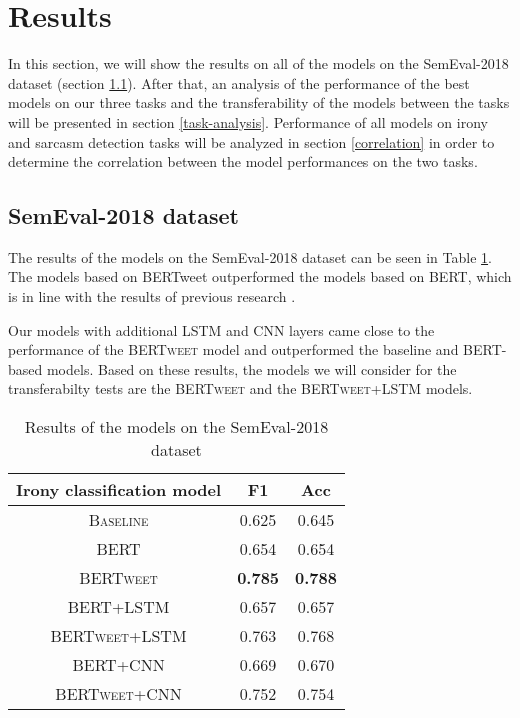 \documentclass[10pt, a4paper]{article}
\begin{document}
\section{Results}

In this section, we will show the results on all of the models on the SemEval-2018 dataset (section \ref{semeval-results}).
After that, an analysis of the performance of the best models on our three tasks and the transferability of the models between
the tasks will be presented in section \ref{task-analysis}. Performance of all models on irony and sarcasm detection tasks
will be analyzed in section \ref{correlation} in order to determine the correlation between the model performances on the two tasks.

\subsection{SemEval-2018 dataset}\label{semeval-results}

The results of the models on the SemEval-2018 dataset can be seen in Table \ref{tab:semeval-2018}. The models based on
BERTweet outperformed the models based on BERT, which is in line with the results of previous research \citep{bertweet}.

Our models with additional LSTM and CNN layers came close to the performance of the \textsc{BERTweet} model and outperformed
the baseline and BERT-based models. Based on these results, the models we will consider for the transferabilty tests are the
\textsc{BERTweet} and the \textsc{BERTweet+LSTM} models.

\begin{table}[h]
   \caption{Results of the models on the SemEval-2018 dataset}
   \label{tab:semeval-2018}
   \begin{center}
   \begin{tabular}{|c|c|c|}
   \toprule
   Irony classification model & F1 & Acc\\
   \midrule
   \textsc{Baseline} & 0.625 & 0.645 \\
   \textsc{BERT} & 0.654 & 0.654 \\
   \textsc{BERTweet} & \textbf{0.785} & \textbf{0.788} \\
   \textsc{BERT+LSTM} & 0.657 & 0.657 \\
   \textsc{BERTweet+LSTM} & 0.763 & 0.768 \\
   \textsc{BERT+CNN} & 0.669 & 0.670 \\
   \textsc{BERTweet+CNN} & 0.752 & 0.754 \\
   \bottomrule
   \end{tabular}
   \end{center}
\end{table}
\end{document}
